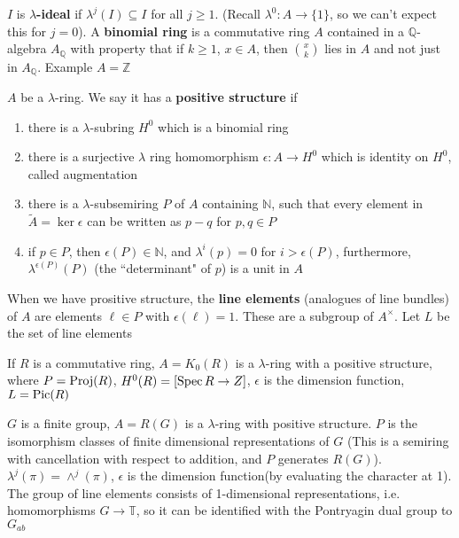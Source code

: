 \documentclass[main]{subfiles}
\begin{document}
\begin{definition}
$I$ is \textbf{$\lambda$-ideal} if $\lambda^j(I)\subseteq I$ for all $j\geq1$. (Recall $\lambda^0:A\to\{1\}$, so we can't expect this for $j=0$). A \textbf{binomial ring} is a commutative ring $A$ contained in a $\mathbb Q$-algebra $A_\mathbb Q$ with property that if $k\geq1$, $x\in A$, then $\binom{x}{k}$ lies in $A$ and not just in $A_{\mathbb Q}$. Example $A=\mathbb Z$
\end{definition}

\begin{definition}
$A$ be a $\lambda$-ring. We say it has a \textbf{positive structure} if
\begin{enumerate}[label=(\roman*)]
\item there is a $\lambda$-subring $H^0$ which is a binomial ring
\item there is a surjective $\lambda$ ring homomorphism $\epsilon:A\to H^0$ which is identity on $H^0$, called augmentation
\item there is a $\lambda$-subsemiring $P$ of $A$ containing $\mathbb N$, such that every element in $\tilde A=\ker\epsilon$ can be written as $p-q$ for $p,q\in P$
\item if $p\in P$, then $\epsilon(P)\in\mathbb N$, and $\lambda^i(p)=0$ for $i>\epsilon(P)$, furthermore, $\lambda^{\epsilon(P)}(P)$ (the ``determinant" of $p$) is a unit in $A$
\end{enumerate}
\end{definition}

When we have prositive structure, the \textbf{line elements} (analogues of line bundles) of $A$ are elements $\ell\in P$ with $\epsilon(\ell)=1$. These are a subgroup of $A^\times$. Let $L$ be the set of line elements

\begin{example}
If $R$ is a commutative ring, $A=K_0(R)$ is a $\lambda$-ring with a positive structure, where $P=\operatorname{Proj}(R)$, $H^0(R)=[\operatorname{Spec} R\to Z]$, $\epsilon$ is the dimension function, $L=\operatorname{Pic}(R)$
\end{example}

\begin{example}
$G$ is a finite group, $A=R(G)$ is a $\lambda$-ring with positive structure. $P$ is the isomorphism classes of finite dimensional representations of $G$ (This is a semiring with cancellation with respect to addition, and $P$ generates $R(G)$). $\lambda^j(\pi)=\wedge^j(\pi)$, $\epsilon$ is the dimension function(by evaluating the character at 1). The group of line elements consists of 1-dimensional representations, i.e. homomorphisms $G\to\mathbb T$, so it can be identified with the Pontryagin dual group to $G_{ab}$
\end{example}
\end{document}
